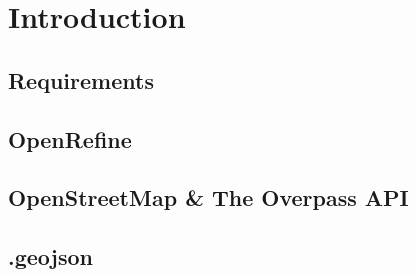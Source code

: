 \chapter{Introduction}
\section{Requirements}
\lipsum[1-3]
\section{OpenRefine}
\lipsum[8-10]
\section{OpenStreetMap \& The Overpass API}
\lipsum[5-6]
\section{.geojson}
